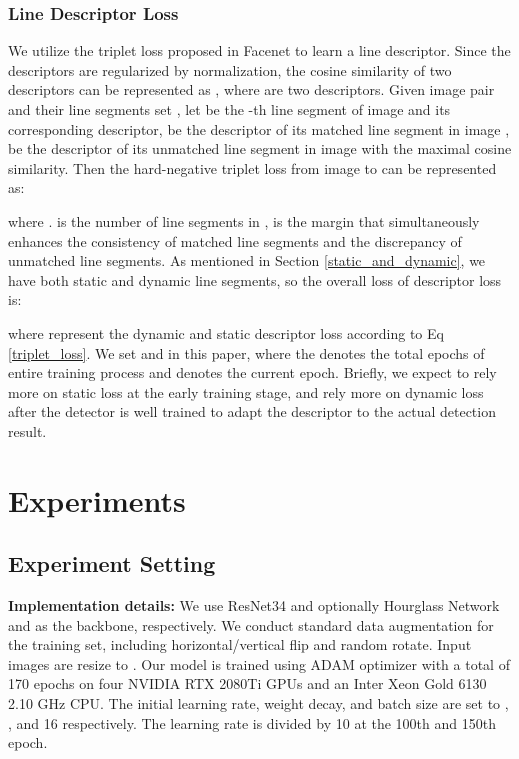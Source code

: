 \documentclass[10pt,twocolumn,letterpaper]{article}
\begin{document}
\subsubsection{Line Descriptor Loss}
We utilize the triplet loss proposed in Facenet\cite{Triplet} to learn a line descriptor. Since the descriptors are regularized by  normalization, the cosine similarity of two descriptors can be represented as , where  are two descriptors. Given image pair  and their line segments set , let  be the -th line segment of image  and its corresponding descriptor,  be the descriptor of its matched line segment in image ,  be the descriptor of its unmatched line segment in image  with the maximal cosine similarity. Then the hard-negative triplet loss from image  to  can be represented as:
\begin{small}

\end{small}
where .  is the number of line segments in ,  is the margin that simultaneously enhances the  consistency of matched line segments and the discrepancy of unmatched line segments.
As mentioned in Section \ref{static_and_dynamic}, we have both static and dynamic line segments, so the overall loss of descriptor loss is:
\begin{small}

\end{small}
where  represent the dynamic and static descriptor loss according to Eq \eqref{triplet_loss}. We set  and  in this paper, where the  denotes the total epochs of entire training process and  denotes the current epoch. Briefly, we expect to rely more on static loss at the early training stage, and rely more on dynamic loss after the detector is well trained to adapt the descriptor to the actual detection result.
\section{Experiments}


\subsection{Experiment Setting}

\textbf{Implementation details:}
We use ResNet34\cite{ResNet} and optionally Hourglass Network\cite{Hourglass} and as the backbone, respectively. We conduct standard data augmentation for the training set, including horizontal/vertical flip and random rotate. Input images are resize to .  Our model is trained using ADAM\cite{Adam} optimizer with a total of 170 epochs on four NVIDIA RTX 2080Ti GPUs and an Inter Xeon Gold 6130 2.10 GHz CPU. The initial learning rate, weight decay, and batch size are set to , , and 16 respectively. The learning rate is divided by 10 at the 100th and 150th epoch.
\end{document}
